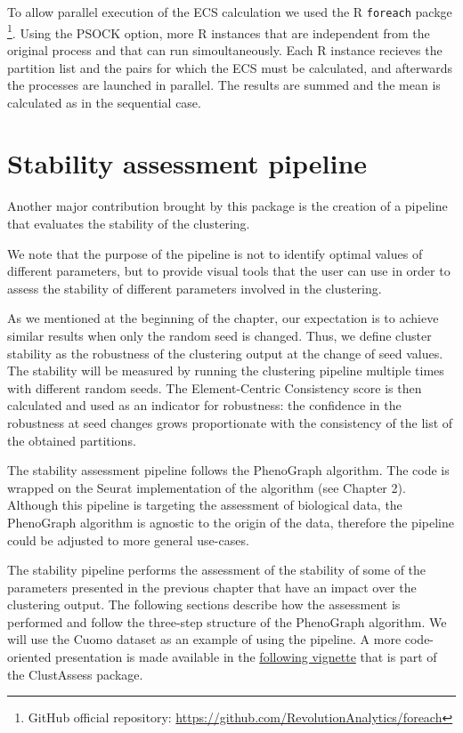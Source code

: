 To allow parallel execution of the ECS calculation we used the R \verb|foreach| packge \footnote{GitHub official repository: \url{https://github.com/RevolutionAnalytics/foreach}}. Using the PSOCK option, more R instances that are independent from the original process and that can run simoultaneously. Each R instance recieves the partition list and the pairs for which the ECS must be calculated, and afterwards the processes are launched in parallel. The results are summed and the mean is calculated as in the sequential case.

\section{Stability assessment pipeline}
Another major contribution brought by this package is the creation of a pipeline that evaluates the stability of the clustering.

We note that the purpose of the pipeline is not to identify optimal values of different parameters, but to provide visual tools that the user can use in order to assess the stability of different parameters involved in the clustering.

As we mentioned at the beginning of the chapter, our expectation is to achieve similar results when only the random seed is changed. Thus, we define cluster stability as the robustness of the clustering output at the change of seed values. The stability will be measured by running the clustering pipeline multiple times with different random seeds. The Element-Centric Consistency score is then calculated and used as an indicator for robustness: the confidence in the robustness at seed changes grows proportionate with the consistency of the list of the obtained partitions.

The stability assessment pipeline follows the PhenoGraph \cite{Levine2015} algorithm. The code is wrapped on the Seurat implementation of the algorithm (see Chapter 2). Although this pipeline is targeting the assessment of biological data, the PhenoGraph algorithm is agnostic to the origin of the data, therefore the pipeline could be adjusted to more general use-cases.

The stability pipeline performs the assessment of the stability of some of the parameters presented in the previous chapter that have an impact over the clustering output. The following sections describe how the assessment is performed and follow the three-step structure of the PhenoGraph algorithm. We will use the Cuomo \cite{Cuomo2020} dataset as an example of using the pipeline. A more code-oriented presentation is made available in the \href{https://core-bioinformatics.github.io/ClustAssess/articles/stability-based-parameter-assessment.html}{following vignette} that is part of the ClustAssess package.


